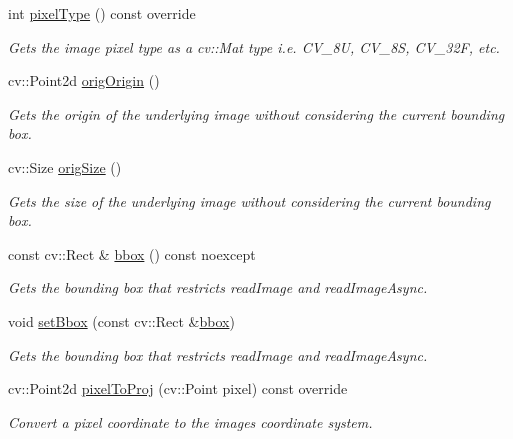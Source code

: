 \begin{DoxyCompactItemize}
int \hyperlink{classdg_1_1deepcore_1_1imagery_1_1_gdal_image_a2703af86b94a85181d5dc8c98dc7bc1a}{pixel\+Type} () const override
\begin{DoxyCompactList}\small\item\em Gets the image pixel type as a cv\+::\+Mat type i.\+e. C\+V\+\_\+8U, C\+V\+\_\+8S, C\+V\+\_\+32F, etc. \end{DoxyCompactList}\item 
cv\+::\+Point2d \hyperlink{group___imagery_module_gac2b4bcd00b506caa4a1d4a08b296e35c}{orig\+Origin} ()
\begin{DoxyCompactList}\small\item\em Gets the origin of the underlying image without considering the current bounding box. \end{DoxyCompactList}\item 
cv\+::\+Size \hyperlink{group___imagery_module_ga7e8ae8a7ad9fc775b39d358e1cd21647}{orig\+Size} ()
\begin{DoxyCompactList}\small\item\em Gets the size of the underlying image without considering the current bounding box. \end{DoxyCompactList}\item 
const cv\+::\+Rect \& \hyperlink{group___imagery_module_ga0fb4c1ea48ddb710e97310baddb9f63d}{bbox} () const noexcept
\begin{DoxyCompactList}\small\item\em Gets the bounding box that restricts read\+Image and read\+Image\+Async. \end{DoxyCompactList}\item 
void \hyperlink{group___imagery_module_ga9391ed841c25ec1391bbb577aa2b81d6}{set\+Bbox} (const cv\+::\+Rect \&\hyperlink{group___imagery_module_ga0fb4c1ea48ddb710e97310baddb9f63d}{bbox})
\begin{DoxyCompactList}\small\item\em Gets the bounding box that restricts read\+Image and read\+Image\+Async. \end{DoxyCompactList}\item 
cv\+::\+Point2d \hyperlink{classdg_1_1deepcore_1_1imagery_1_1_gdal_image_a0dfbdd1a7a6260f38e67bbe10eb1007c}{pixel\+To\+Proj} (cv\+::\+Point pixel) const override
\begin{DoxyCompactList}\small\item\em Convert a pixel coordinate to the image\textquotesingle{}s coordinate system. \end{DoxyCompactList}\item 

\end{DoxyCompactItemize}
